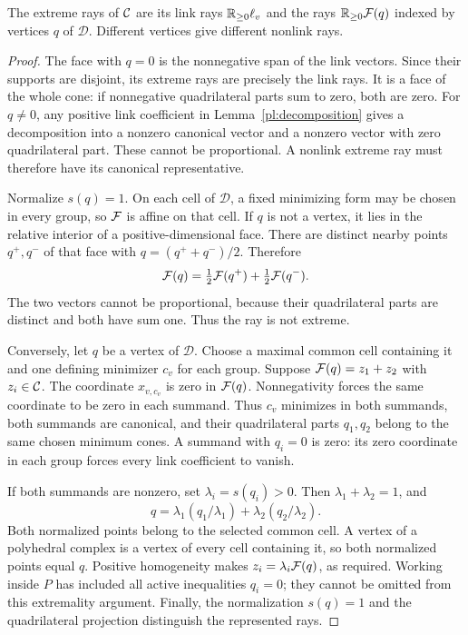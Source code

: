 \begin{theorem}
\label{pl:ray-correspondence}
The extreme rays of \(\mathcal{C}\) are its link rays
\(\mathbb{R}_{\geq0}\ell_v\) and the rays
\(\mathbb{R}_{\geq0}\mathcal{F}(q)\) indexed by vertices \(q\) of \(\mathcal D\).
Different vertices give different nonlink rays.
\end{theorem}
\begin{proof}
The face with \(q=0\) is the nonnegative span of the link vectors.
Since their supports are disjoint, its extreme rays are precisely
the link rays.  It is a face of the whole cone: if nonnegative
quadrilateral parts sum to zero, both are zero.
For \(q\neq0\), any positive link coefficient in
Lemma~\ref{pl:decomposition} gives a decomposition into a nonzero
canonical vector and a nonzero vector with zero quadrilateral part.
These cannot be proportional.  A nonlink extreme ray must therefore
have its canonical representative.

Normalize \(s(q)=1\).  On each cell of \(\mathcal D\), a fixed
minimizing form may be chosen in every group, so \(\mathcal{F}\) is affine
on that cell.  If \(q\) is not a vertex, it lies in the relative
interior of a positive-dimensional face.  There are distinct nearby
points \(q^+,q^-\) of that face with
\(q=(q^++q^-)/2\).  Therefore
\[
 \mathcal{F}(q)=\tfrac12\mathcal{F}(q^+)+\tfrac12\mathcal{F}(q^-).
\]
The two vectors cannot be proportional, because their quadrilateral
parts are distinct and both have sum one.  Thus the ray is not
extreme.

Conversely, let \(q\) be a vertex of \(\mathcal D\).  Choose a
maximal common cell containing it and one defining minimizer \(c_v\)
for each group.  Suppose
\(\mathcal{F}(q)=z_1+z_2\) with \(z_i\in\mathcal{C}\).
The coordinate \(x_{v,c_v}\) is zero in \(\mathcal{F}(q)\).
Nonnegativity forces the same coordinate to be zero in each
summand.  Thus \(c_v\) minimizes in both summands, both summands
are canonical, and their quadrilateral parts \(q_1,q_2\) belong
to the same chosen minimum cones.
A summand with \(q_i=0\) is zero: its zero coordinate in each group
forces every link coefficient to vanish.

If both summands are nonzero, set \(\lambda_i=s(q_i)>0\).
Then \(\lambda_1+\lambda_2=1\), and
\[
 q=\lambda_1(q_1/\lambda_1)+
   \lambda_2(q_2/\lambda_2).
\]
Both normalized points belong to the selected common cell.
A vertex of a polyhedral complex is a vertex of every cell containing
it, so both normalized points equal \(q\).
Positive homogeneity makes \(z_i=\lambda_i\mathcal{F}(q)\), as required.
Working inside \(P\) has included all active inequalities \(q_i=0\);
they cannot be omitted from this extremality argument.
Finally, the normalization \(s(q)=1\) and the quadrilateral
projection distinguish the represented rays.
\end{proof}

